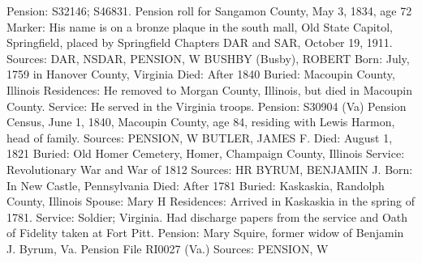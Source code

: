 Pension: S32146; S46831. Pension roll for Sangamon County, May 3, 1834, age 72 
Marker: His name is on a bronze plaque in the south mall, Old State Capitol, Springfield, placed by Springfield Chapters DAR and SAR, October 19, 1911. 
Sources: DAR, NSDAR, PENSION, W 
BUSHBY (Busby), ROBERT 
Born: July, 1759 in Hanover County, Virginia 
Died: After 1840 
Buried: Macoupin County, Illinois 
Residences: He removed to Morgan County, Illinois, but died in Macoupin County. 
Service: He served in the Virginia troops. 
Pension: S30904 (Va) Pension Census, June 1, 1840, Macoupin County, age 84, residing with Lewis Harmon, head of family. 
Sources: PENSION, W 
BUTLER, JAMES F. 
Died: August 1, 1821 
Buried: Old Homer Cemetery, Homer, Champaign County, Illinois 
Service: Revolutionary War and War of 1812 
Sources: HR 
BYRUM, BENJAMIN J. 
Born: In New Castle, Pennsylvania 
Died: After 1781 
Buried: Kaskaskia, Randolph County, Illinois 
Spouse: Mary H
Residences: Arrived in Kaskaskia in the spring of 1781. 
Service: Soldier; Virginia. Had discharge papers from the service and Oath of Fidelity taken at Fort Pitt. 
Pension: Mary Squire, former widow of Benjamin J. Byrum, Va. Pension File RI0027 (Va.) 
Sources: PENSION, W 


